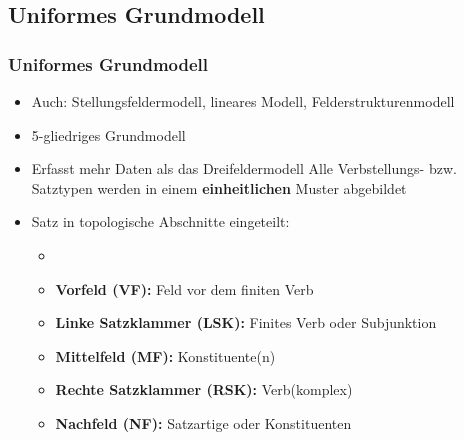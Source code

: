 \subsection{Uniformes Grundmodell}


\begin{frame}
\frametitle{Uniformes Grundmodell}

\begin{itemize}
	\item Auch: Stellungsfeldermodell,  lineares Modell, Felderstrukturenmodell 
	\item 5-gliedriges Grundmodell
	\item Erfasst mehr Daten als das Dreifeldermodell \ras Alle Verbstellungs- bzw. Satztypen werden in einem \textbf{einheitlichen} Muster abgebildet
\end{itemize}

\end{frame}

\begin{frame}

\begin{itemize}
	\item Satz in topologische Abschnitte eingeteilt:
	\begin{itemize}
		\item []
		\item \textbf{Vorfeld (VF):} Feld vor dem finiten Verb
		\item \textbf{Linke Satzklammer (LSK):} Finites Verb oder Subjunktion
		\item \textbf{Mittelfeld (MF):} Konstituente(n)
		\item \textbf{Rechte Satzklammer (RSK):} Verb(komplex)
		\item \textbf{Nachfeld (NF):} Satzartige oder  Konstituenten
	\end{itemize}
\pause
\end{itemize}

\begin{table}
\centering
{}
\end{table}
	
\end{frame}


